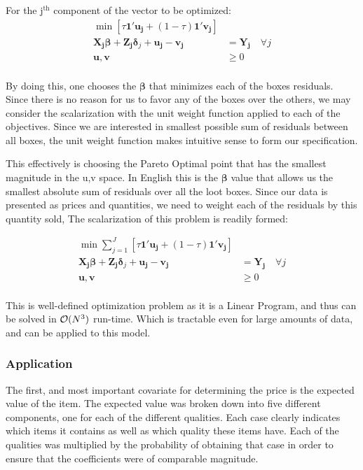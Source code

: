 \documentclass[12pt, letterpaper]{paper}
\def\BigO{{\cal O}}
\begin{document}
For the j$^{\text{th}}$ component of the vector to be optimized:
\begin{align*}
\min \left [ \tau \bm{1}' \bm{u_j} + (1-\tau) \bm{1}' \bm{v_j} \right ]&\\
\bm{X_j} \bm{\beta} + \bm{Z_j} \bm{\delta}_j+ \bm{u_j} - \bm{v_j} &= \bm{Y_j} \quad \forall j\\
\bm{u},\bm{v} &\geq 0\\
\end{align*}

By doing this, one chooses the $\bm{\beta}$ that minimizes each of the boxes
residuals. Since there is no reason for us to favor any of the boxes
over the others, we may consider the scalarization with the unit
weight function applied to each of the objectives. Since we are
interested in smallest possible sum of residuals between all boxes,
the unit weight function makes intuitive sense to form our specification.

This effectively is choosing the Pareto Optimal point that has the
smallest magnitude in the u,v space. In English this is the $\bm{\beta}$ value
that allows us the smallest absolute sum of residuals over all the
loot boxes. Since our data is presented as prices and quantities, we
need to weight each of the residuals by this quantity sold, The
scalarization of this problem is readily formed:

\begin{align*}
\min \sum_{j=1}^J \left [ \tau \bm{1}' \bm{u_j} + (1-\tau) \bm{1}' \bm{v_j} \right ]\\
\bm{X_j} \bm{\beta} + \bm{Z_j} \bm{\delta}_j+ \bm{u_j} - \bm{v_j} &= \bm{Y_j} \quad \forall j\\
\bm{u},\bm{v} &\geq 0\\
\end{align*}

This is well-defined optimization problem as it is a Linear Program,
and thus can be solved in $\BigO (N^3)$ run-time. Which is tractable
even for large amounts of data, and can be applied to this model.

\subsubsection{Application}
\label{sec-4-6-2}

The first, and most important covariate for determining the price is
the expected value of the item. The expected value was broken down
into five different components, one for each of the different
qualities. Each case clearly indicates which items it contains as well
as which quality these items have. Each of the qualities was
multiplied by the probability of obtaining that case in order to
ensure that the coefficients were of comparable magnitude. 
\end{document}
